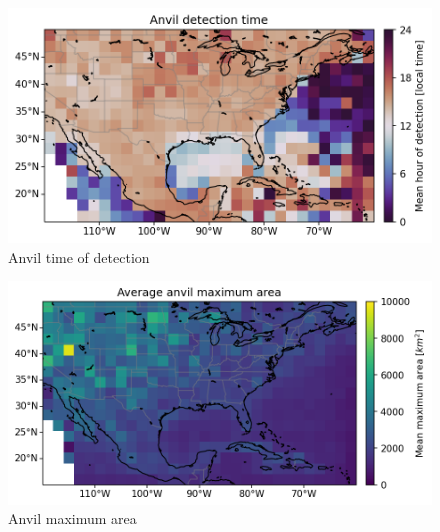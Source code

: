 \begin{figure}[tp]
    \centering
    \includegraphics[width=\textwidth]{figures/ch2_16.png}
    \caption{Anvil time of detection}
    \label{fig:anvil_detection_time_map}
\end{figure}

\begin{figure}[tp]
    \centering
    \includegraphics[width=\textwidth]{figures/ch2_17.png}
    \caption{Anvil maximum area}
    \label{fig:anvil_area_map}
\end{figure}

